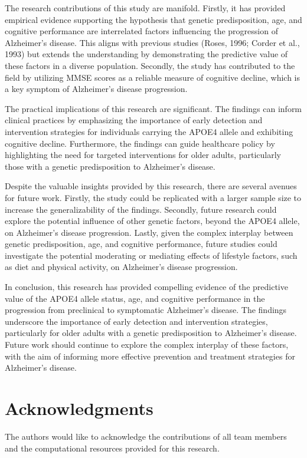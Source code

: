 \documentclass[conference]{IEEEtran}
\begin{document}
The research contributions of this study are manifold. Firstly, it has provided empirical evidence supporting the hypothesis that genetic predisposition, age, and cognitive performance are interrelated factors influencing the progression of Alzheimer's disease. This aligns with previous studies (Roses, 1996; Corder et al., 1993) but extends the understanding by demonstrating the predictive value of these factors in a diverse population. Secondly, the study has contributed to the field by utilizing MMSE scores as a reliable measure of cognitive decline, which is a key symptom of Alzheimer's disease progression.

The practical implications of this research are significant. The findings can inform clinical practices by emphasizing the importance of early detection and intervention strategies for individuals carrying the APOE4 allele and exhibiting cognitive decline. Furthermore, the findings can guide healthcare policy by highlighting the need for targeted interventions for older adults, particularly those with a genetic predisposition to Alzheimer's disease.

Despite the valuable insights provided by this research, there are several avenues for future work. Firstly, the study could be replicated with a larger sample size to increase the generalizability of the findings. Secondly, future research could explore the potential influence of other genetic factors, beyond the APOE4 allele, on Alzheimer's disease progression. Lastly, given the complex interplay between genetic predisposition, age, and cognitive performance, future studies could investigate the potential moderating or mediating effects of lifestyle factors, such as diet and physical activity, on Alzheimer's disease progression.

In conclusion, this research has provided compelling evidence of the predictive value of the APOE4 allele status, age, and cognitive performance in the progression from preclinical to symptomatic Alzheimer's disease. The findings underscore the importance of early detection and intervention strategies, particularly for older adults with a genetic predisposition to Alzheimer's disease. Future work should continue to explore the complex interplay of these factors, with the aim of informing more effective prevention and treatment strategies for Alzheimer's disease.

\section{Acknowledgments}
The authors would like to acknowledge the contributions of all team members and the computational resources provided for this research.
\end{document}
